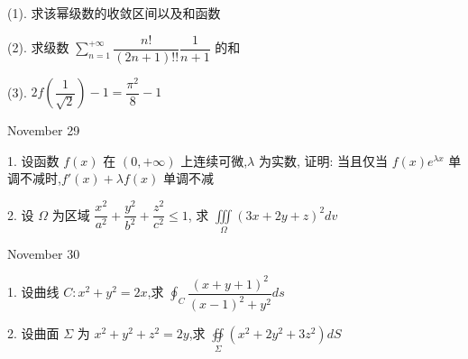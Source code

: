 (1). 求该幂级数的收敛区间以及和函数

(2). 求级数 $\sum\limits_{n=1}^{+\infty}\dfrac{n!}{(2n+1)!!}\dfrac{1}{n+1}$ 的和

(3). $2f(\dfrac{1}{\sqrt{2}})-1=\dfrac{\pi^{2}}{8}-1$
\begin{solution}
	
\end{solution}

\textcolor{purplea}{November 29}

1. 设函数 $f(x)$ 在 $(0,+\infty)$ 上连续可微,$\lambda$ 为实数,
证明: 当且仅当 $f(x)e^{\lambda x}$ 单调不减时,$f'(x)+\lambda f(x)$ 单调不减
\begin{solution}
	
\end{solution}

2. 设 $\Omega$ 为区域 $\dfrac{x^{2}}{a^{2}}+\dfrac{y^{2}}{b^{2}}+\dfrac{z^{2}}{c^{2}}\leq 1$,
求 $\displaystyle{\iiint\limits_{\Omega}(3x+2y+z)^{2}dv}$
\begin{solution}
	
\end{solution}

\textcolor{purplea}{November 30}

1. 设曲线 $C:x^{2}+y^{2}=2x$,求 $\displaystyle{\oint_{C}\dfrac{(x+y+1)^{2}}{(x-1)^{2}+y^{2}}ds}$
\begin{solution}
	
\end{solution}

2. 设曲面 $\Sigma$ 为 $x^{2}+y^{2}+z^{2}=2y$,求 $\displaystyle{\oiint\limits_{\Sigma}(x^{2}+2y^{2}+3z^{2})dS}$
\begin{solution}
	
\end{solution}

